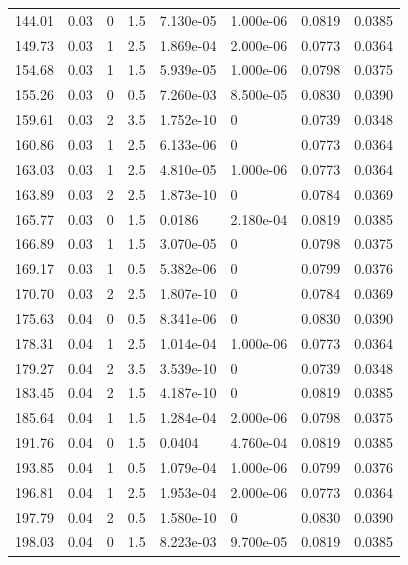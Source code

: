 \documentclass[preview]{standalone}
\begin{document}
{{{\begin{tabular}{L{1.2cm}C{1.2cm} C{0.3cm}C{0.5cm} C{1.4cm}C{1.4cm} C{1.4cm}C{1.4cm}}
  144.01  &  0.03  & 0     & 1.5 &  7.130e-05  & 1.000e-06  & 0.0819 &  0.0385   \\ 
  149.73  &  0.03  & 1     & 2.5 &  1.869e-04  & 2.000e-06  & 0.0773 &  0.0364   \\ 
  154.68  &  0.03  & 1     & 1.5 &  5.939e-05  & 1.000e-06  & 0.0798 &  0.0375   \\ 
  155.26  &  0.03  & 0     & 0.5 &  7.260e-03  & 8.500e-05  & 0.0830 &  0.0390   \\ 
  159.61  &  0.03  & 2     & 3.5 &  1.752e-10  & 0  & 0.0739 &  0.0348   \\ 
  160.86  &  0.03  & 1     & 2.5 &  6.133e-06  & 0  & 0.0773 &  0.0364   \\ 
  163.03  &  0.03  & 1     & 2.5 &  4.810e-05  & 1.000e-06  & 0.0773 &  0.0364   \\ 
  163.89  &  0.03  & 2     & 2.5 &  1.873e-10  & 0  & 0.0784 &  0.0369   \\ 
  165.77  &  0.03  & 0     & 1.5 &  0.0186  & 2.180e-04  & 0.0819 &  0.0385   \\ 
  166.89  &  0.03  & 1     & 1.5 &  3.070e-05  & 0  & 0.0798 &  0.0375   \\ 
  169.17  &  0.03  & 1     & 0.5 &  5.382e-06  & 0  & 0.0799 &  0.0376   \\ 
  170.70  &  0.03  & 2     & 2.5 &  1.807e-10  & 0  & 0.0784 &  0.0369   \\ 
  175.63  &  0.04  & 0     & 0.5 &  8.341e-06  & 0  & 0.0830 &  0.0390   \\ 
  178.31  &  0.04  & 1     & 2.5 &  1.014e-04  & 1.000e-06  & 0.0773 &  0.0364   \\ 
  179.27  &  0.04  & 2     & 3.5 &  3.539e-10  & 0  & 0.0739 &  0.0348   \\ 
  183.45  &  0.04  & 2     & 1.5 &  4.187e-10  & 0  & 0.0819 &  0.0385   \\ 
  185.64  &  0.04  & 1     & 1.5 &  1.284e-04  & 2.000e-06  & 0.0798 &  0.0375   \\ 
  191.76  &  0.04  & 0     & 1.5 &  0.0404  & 4.760e-04  & 0.0819 &  0.0385   \\ 
  193.85  &  0.04  & 1     & 0.5 &  1.079e-04  & 1.000e-06  & 0.0799 &  0.0376   \\ 
  196.81  &  0.04  & 1     & 2.5 &  1.953e-04  & 2.000e-06  & 0.0773 &  0.0364   \\ 
  197.79  &  0.04  & 2     & 0.5 &  1.580e-10  & 0  & 0.0830 &  0.0390   \\ 
  198.03  &  0.04  & 0     & 1.5 &  8.223e-03  & 9.700e-05  & 0.0819 &  0.0385   \\ 

\end{tabular}}}}
\end{document}
